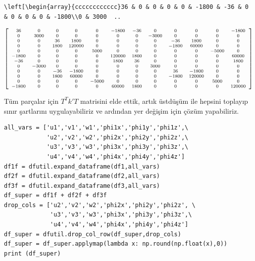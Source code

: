 \documentclass[12pt,fleqn]{article}\usepackage{../../common}
\begin{document}
\begin{verbatim}
\left[\begin{array}{cccccccccccc}36 & 0 & 0 & 0 & 0 & -1800 & -36 & 0 & 0 & 0 & 0 & -1800\\0 & 3000  ..
\end{verbatim}

$$  
\scriptsize
\left[\begin{array}{cccccccccccc}36 & 0 & 0 & 0 & 0 & -1800 & -36 & 0 & 0 & 0 &
    0 & -1800\\0 & 3000 & 0 & 0 & 0 & 0 & 0 & -3000 & 0 & 0 & 0 & 0\\0 & 0 & 36
    & 1800 & 0 & 0 & 0 & 0 & -36 & 1800 & 0 & 0\\0 & 0 & 1800 & 120000 & 0 & 0 &
    0 & 0 & -1800 & 60000 & 0 & 0\\0 & 0 & 0 & 0 & 5000 & 0 & 0 & 0 & 0 & 0 &
    -5000 & 0\\-1800 & 0 & 0 & 0 & 0 & 120000 & 1800 & 0 & 0 & 0 & 0 &
    60000\\-36 & 0 & 0 & 0 & 0 & 1800 & 36 & 0 & 0 & 0 & 0 & 1800\\0 & -3000 & 0
    & 0 & 0 & 0 & 0 & 3000 & 0 & 0 & 0 & 0\\0 & 0 & -36 & -1800 & 0 & 0 & 0 & 0
    & 36 & -1800 & 0 & 0\\0 & 0 & 1800 & 60000 & 0 & 0 & 0 & 0 & -1800 & 120000
    & 0 & 0\\0 & 0 & 0 & 0 & -5000 & 0 & 0 & 0 & 0 & 0 & 5000 & 0\\-1800 & 0 & 0
    & 0 & 0 & 60000 & 1800 & 0 & 0 & 0 & 0 & 120000\end{array}\right]
$$

Tüm parçalar için $T^T k'T$ matrisini elde ettik, artık üstdüşüm ile hepsini
toplayıp sınır şartlarını uygulayabiliriz ve ardından yer değişim için çözüm
yapabiliriz.

\begin{verbatim}
all_vars = ['u1','v1','w1','phi1x','phi1y','phi1z',\
            'u2','v2','w2','phi2x','phi2y','phi2z',\
            'u3','v3','w3','phi3x','phi3y','phi3z',\
            'u4','v4','w4','phi4x','phi4y','phi4z']
df1f = dfutil.expand_dataframe(df1,all_vars)
df2f = dfutil.expand_dataframe(df2,all_vars)
df3f = dfutil.expand_dataframe(df3,all_vars)
df_super = df1f + df2f + df3f
drop_cols = ['u2','v2','w2','phi2x','phi2y','phi2z', \
             'u3','v3','w3','phi3x','phi3y','phi3z',\
             'u4','v4','w4','phi4x','phi4y','phi4z']
df_super = dfutil.drop_col_row(df_super,drop_cols)
df_super = df_super.applymap(lambda x: np.round(np.float(x),0))
print (df_super)
\end{verbatim}
\end{document}
